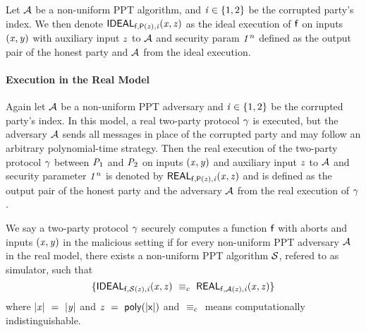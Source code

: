 Let $\mathcal{A}$ be a non-uniform PPT algorithm, and $\mathit{i} \in \{1,2\}$ be the corrupted party's index.
We then denote $\mathsf{IDEAL}_{\mathsf{f}, \mathsf{P}(\mathit{z}), \mathit{i}}(\mathit{x}, \mathit{z})$ as the ideal execution of $\mathsf{f}$ on inputs $(\mathit{x}, \mathit{y})$ with auxiliary input $\mathit{z}$ to $\mathcal{A}$ and security param $\mathit{1^n}$ defined as the output pair of the honest party and $\mathcal{A}$ from the ideal execution.

\paragraph{Execution in the Real Model} Again let $\mathcal{A}$ be a non-uniform PPT adversary and $\mathit{i} \in \{1,2\}$ be the corrupted party's index.
In this model, a real two-party protocol $\gamma$ is executed, but the adversary $\mathcal{A}$ sends all messages in place of the corrupted party and may follow an arbitrary polynomial-time strategy.
Then the real execution of the two-party protocol $\gamma$ between $\mathit{P}_{1}$ and $\mathit{P}_{2}$ on inputs $(\mathit{x}, \mathit{y})$ and auxiliary input $\mathit{z}$ to $\mathcal{A}$ and security parameter $\mathit{1^n}$ is denoted by $\mathsf{REAL}_{\mathsf{f}, \mathsf{P}(\mathit{z}), \mathit{i}}(\mathit{x}, \mathit{z})$ and is defined as the output pair of the honest party and the adversary $\mathcal{A}$ from the real execution of $\gamma$.

\begin{definition}\label{subsec:pre:security}
    We say a two-party protocol $\gamma$ securely computes a function $\mathsf{f}$ with aborts and inputs $(\mathit{x}, \mathit{y})$ in the malicious setting if for every non-uniform PPT adversary $\mathcal{A}$ in the real model, there exists a non-uniform PPT algorithm $\mathcal{S}$, refered to as simulator, such that
    \[
        \{ \mathsf{IDEAL}_{\mathsf{f}, \mathcal{S}(\mathit{z}), \mathit{i}}(\mathit{x}, \mathit{z}) ~\equiv_{c}~ \mathsf{REAL}_{\mathsf{f}, \mathcal{A}(\mathit{z}), \mathit{i}}(\mathit{x}, \mathit{z}) \}
    \]
    where $|\mathit{x}| ~=~ |\mathit{y}|$ and $\mathit{z} ~=~ \mathsf{poly(|x|)}$ and $~\equiv_{c}~$ means computationally indistinguishable.
\end{definition}